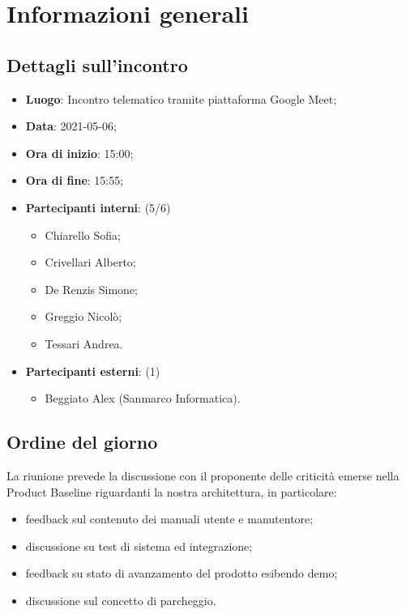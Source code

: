 \section{Informazioni generali}

\subsection{Dettagli sull'incontro}
\begin{itemize}
\item \textbf{Luogo}: Incontro telematico tramite piattaforma Google Meet;
\item \textbf{Data}: 2021-05-06;
\item \textbf{Ora di inizio}: 15:00;
\item \textbf{Ora di fine}: 15:55;
\item \textbf{Partecipanti interni}: (5/6)
\begin{itemize}
	\item Chiarello Sofia;
	\item Crivellari Alberto;
	\item De Renzis Simone;
	\item Greggio Nicolò;
	\item Tessari Andrea.
\end{itemize}
\item \textbf{Partecipanti esterni}: (1)
\begin{itemize}
	\item Beggiato Alex (Sanmarco Informatica).
\end{itemize}
\end{itemize}

\subsection{Ordine del giorno}

La riunione prevede la discussione con il proponente delle criticità emerse nella Product Baseline riguardanti la nostra architettura, in particolare:
\begin{itemize}
    \item feedback sul contenuto dei manuali utente e manutentore;
    \item discussione su test di sistema ed integrazione;
    \item feedback su stato di avanzamento del prodotto esibendo demo;
    \item discussione sul concetto di parcheggio.
\end{itemize}





